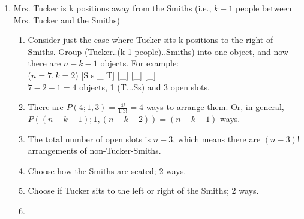 \documentclass[12pt]{amsart}
\begin{document}
\begin{enumerate}
\begin{enumerate}
     \item Mrs. Tucker is k positions away from the Smiths (i.e., $k - 1$ people between Mrs. Tucker and the Smiths)
        \begin{enumerate}
            \item Consider just the case where Tucker sits k positions to the right of Smiths. Group (Tucker..(k-1 people)..Smiths) into one object, and now there are $n-k-1$ objects. For example:\\
            ($n=7,k=2$) [S s {\_} T] [{\_}] [{\_}] [{\_}]\\
            $7-2-1=4$ objects, 1 (T...Ss) and 3 open slots.
            \item There are $P(4;1,3)= \frac{4!}{1!3!}=4$ ways to arrange them. Or, in general, $P((n-k-1);1,(n-k-2))=(n-k-1)$ ways.
            \item The total number of open slots is $n-3$, which means there are $(n-3)!$ arrangements of non-Tucker-Smiths.
            \item Choose how the Smiths are seated; 2 ways.
            \item Choose if Tucker sits to the left or right of the Smiths; 2 ways.
            \item {}
        \end{enumerate}

    
\end{enumerate}

\end{enumerate}
\end{document}
